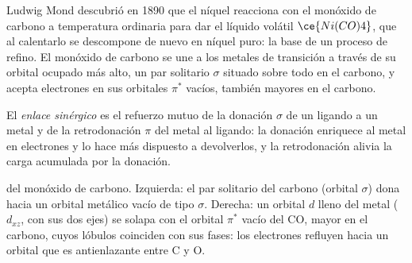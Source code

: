 Ludwig Mond descubrió en 1890 que el níquel reacciona con el monóxido de carbono a temperatura
ordinaria para dar el líquido volátil $\ce{Ni(CO)4}$, que al calentarlo se descompone de nuevo en
níquel puro: la base de un proceso de refino. El monóxido de carbono se une a
los metales de transición a través de su orbital ocupado más alto, un par solitario $\sigma$ situado sobre todo
en el carbono, y acepta electrones en sus orbitales $\pi^*$ vacíos, también mayores en el
carbono.

\begin{definition}\label{def:b3:organometallic-bonding:synergic}
El \emph{enlace sinérgico} es el refuerzo mutuo de la
donación $\sigma$ de un ligando a un metal y de la retrodonación $\pi$ del metal al
ligando: la donación enriquece al metal en electrones y lo hace más dispuesto a
devolverlos, y la retrodonación alivia la carga acumulada por la donación.
\end{definition}

\begin{omfigure}

{\small {} del monóxido de carbono. Izquierda: el par solitario del carbono (orbital
$\sigma$) dona hacia un orbital metálico vacío de tipo $\sigma$. Derecha: un orbital $d$ lleno del metal
($d_{xz}$, con sus dos ejes) se solapa con el orbital $\pi^*$ vacío del CO, mayor en el
carbono, cuyos lóbulos coinciden con sus fases: los electrones refluyen hacia un orbital que es
antienlazante entre C y O.}
\end{omfigure}

